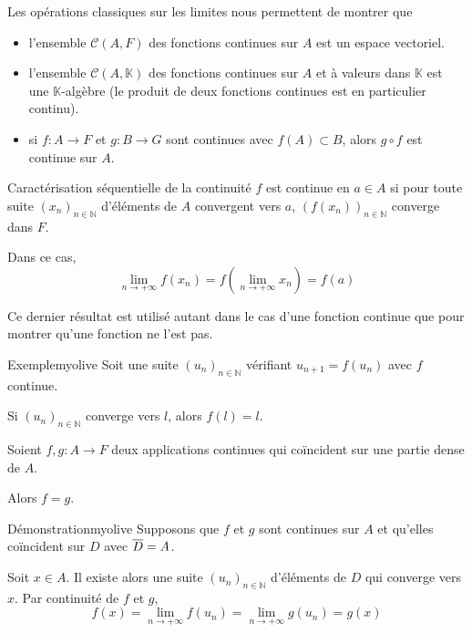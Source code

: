     Les opérations classiques sur les limites nous permettent de montrer que 
    \begin{itemize}
        \item l’ensemble $\mathcal{C}(A,F)$ des fonctions continues sur $A$ est un espace vectoriel.
        \item l’ensemble $\mathcal{C}(A,\mathbb{K})$ des fonctions continues sur $A$ et à valeurs dans $\mathbb{K}$ est une $\mathbb{K}$-algèbre (le produit de deux fonctions continues est en particulier continu).
        \item si $f : A \rightarrow F$ et $g : B \rightarrow G$ sont continues avec $f(A) \subset B$, alors $g \circ f$ est continue sur $A$.
    \end{itemize}

    \begin{prop}{Caractérisation séquentielle de la continuité}{}
        $f$ est continue en $a \in A$ si pour toute suite $(x_n)_{n \in \mathbb{N}}$ d’éléments de $A$ convergent vers $a$, $\left(f(x_n)\right)_{n \in \mathbb{N}}$ converge dans $F$.

        Dans ce cas, 
        \[ \lim\limits_{n \rightarrow +\infty} f(x_n) = f \left(\lim\limits_{n \rightarrow +\infty} x_n\right) = f(a) \] 
    \end{prop}

    Ce dernier résultat est utilisé autant dans le cas d’une fonction continue que pour montrer qu’une fonction ne l’est pas.

    \begin{omed}{Exemple}{myolive}
        Soit une suite $(u_n)_{n \in \mathbb{N}}$ vérifiant $u_{n+1} = f(u_n)$ avec $f$ continue.

        Si $(u_n)_{n \in \mathbb{N}}$ converge vers $l$, alors $f(l)=l$.
    \end{omed}

    \begin{prop}{}{}
        Soient $f,g : A \rightarrow F$ deux applications continues qui coïncident sur une partie dense de $A$. 

        Alors $f = g$.
    \end{prop}

    \begin{demo}{Démonstration}{myolive}
        Supposons que $f$ et $g$ sont continues sur $A$ et qu’elles coïncident sur $D$ avec $\overline{D} = A$.

        Soit $x \in A$. Il existe alors une suite $(u_n)_{n \in \mathbb{N}}$ d’éléments de $D$ qui converge vers $x$. Par continuité de $f$ et $g$,
        \[ f(x) = \lim\limits_{n \rightarrow +\infty} f(u_n) = \lim\limits_{n \rightarrow +\infty} g(u_n) = g(x) \] 
    \end{demo}

